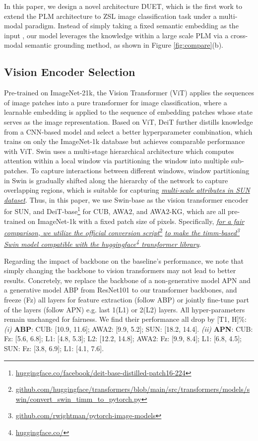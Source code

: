 \documentclass[letterpaper]{article} \usepackage{aaai23}  \usepackage{times}  \usepackage{helvet}  \usepackage{courier}  \usepackage[hyphens]{url}  \usepackage{graphicx} \urlstyle{rm} \def\UrlFont{\rm}  \usepackage{natbib}  \usepackage{caption} \frenchspacing  \setlength{\pdfpagewidth}{8.5in}  \setlength{\pdfpageheight}{11in}  \usepackage{algorithm}
\newcommand{\fy}[1]{{\color{black}#1}}
\begin{document}
In this paper, we design a novel architecture DUET, which is the first work to extend the PLM architecture to ZSL image classification task under a multi-modal paradigm.
Instead of  simply \fy{taking} a fixed semantic embedding as the input \cite{DBLP:journals/corr/abs-2201-00577}, our model leverages the knowledge within a large scale PLM via a cross-modal semantic grounding method, as shown in Figure \ref{fig:compare}(b).

\subsection{Vision Encoder Selection}
Pre-trained on ImageNet-21k, the Vision Transformer (ViT) \cite{DBLP:conf/iclr/DosovitskiyB0WZ21} applies the sequences of image patches into {a} pure transformer for image classification, where a learnable embedding is applied to the sequence of embedding patches whose state serves as the image representation.
Based on ViT, DeiT \cite{DBLP:conf/icml/TouvronCDMSJ21} 
further distill{s knowledge from a CNN-based model} 
and select {a} better hyperparameter combination, {which trains on only the ImageNet-1k database but achieves comparable performance with ViT.
Swin \cite{DBLP:conf/iccv/LiuL00W0LG21} 
use\fy{s} a multi-stage hierarchical architecture which 
computes attention within a local window via partitioning the window into multiple sub-patches.}
To capture interactions between different windows, window partitioning in Swin is gradually shifted along the {hierarchy of the network} to capture overlapping regions, 
which is suitable for capturing \ul{\emph{multi-scale attributes in SUN dataset}}.
Thus, in this paper, 
we use Swin-base as the vision transformer encoder for SUN,
and DeiT-base\footnote{\url{huggingface.co/facebook/deit-base-distilled-patch16-224}}  
for CUB, AWA2, and AWA2-KG, 
which are all pre-trained on ImageNet-1k with a fixed patch size of  pixels.
Specifically, \ul{\emph{for a fair comparison, we utilize the official conversion script}}\footnote{
\url{github.com/huggingface/transformers/blob/main/src/transformers/models/swin/convert_swin_timm_to_pytorch.py}}
\ul{\emph{to make the timm-based\footnote{\url{github.com/rwightman/pytorch-image-models}} Swin model compatible with the huggingface\footnote{\url{huggingface.co/}} transformer library}}. 

Regarding the impact of backbone on the baseline’s performance, we note that simply changing the backbone to vision transformers may not lead to better results. Concretely, we replace the backbone of a non-generative model APN \cite{DBLP:conf/nips/XuXWSA20} and a generative model ABP \cite{DBLP:conf/iccv/ZhuXLE19} from ResNet101 to our transformer backbones, and freeze (Fz) all layers for feature extraction (follow ABP) or jointly fine-tune part of the layers (follow APN) e.g. last 1(L1) or 2(L2) layers. All hyper-parameters remain unchanged for fairness. We find their performance all drop by [T1, H]\%:
\textit{(i)} \textbf{ABP}:
CUB: [10.9, 11.6]; AWA2: [9.9, 5.2]; SUN: [18.2, 14.4].
\textit{(ii)}  \textbf{APN}:
CUB: Fz: [5.6, 6.8]; L1: [4.8, 5.3]; L2: [12.2, 14.8];
AWA2: Fz: [9.9, 8.4]; L1: [6.8, 4.5];
SUN: Fz: [3.8, 6.9]; L1: [4.1, 7.6].
\end{document}
